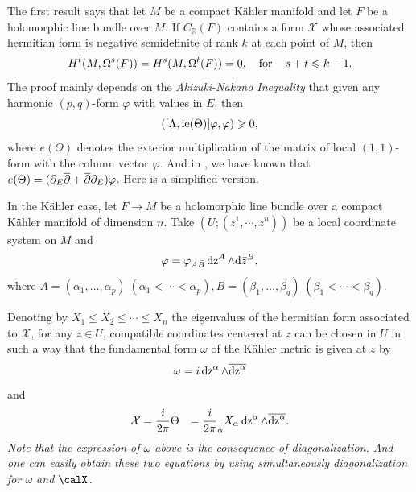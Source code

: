 \documentclass[lang=en,12pt]{beautybook}
\renewcommand{\bd}{\partial}
\begin{document}
The first result says that let $M$ be a
compact K\"ahler manifold and let $F$ be a holomorphic line bundle over $M$. If
$C_{\mathbb{R}} (F)$ contains a form $\mathcal{X}$ whose associated hermitian
form is negative semidefinite of rank $k$ at each point of $M$, then
\[ H^t (M, \Omega^s (F)) = H^s (M, \Omega^t (F)) = 0, \quad \operatorname{for} \quad
  s + t \leqslant k - 1. \]
The proof mainly depends on the \textit{Akizuki-Nakano Inequality} that given any harmonic $(p,
  q)$-form $\varphi$ with values in $E$, then
\begin{equation}
  ([\Lambda, \operatorname{ie} (\Theta)] \varphi, \varphi) \geqslant 0, \label{1}
\end{equation}
where $e(\Theta)$ denotes the exterior multiplication of the matrix of local $(1,1)$-form with the column vector $\varphi$. And in \cite[]{calabi1960compact}, we have known that $e(\Theta)=(\bd_E \bdd+ \bdd\bd_E)\varphi$.
Here is a simplified version.

In the K\"ahler case, let $F \rightarrow M$ be a holomorphic line bundle over a
compact K\"ahler manifold of dimension $n$. Take $(U ; (z^1, \cdots, z^n))$ be a
local coordinate system on $M$ and
\[ \varphi = \relax \varphi_{A \bar{B} } \operatorname{dz}^A \wedge
  \dd \bar z^{B}, \]
where $A=(\alpha_1,\ldots,\alpha_p) \; (\alpha_1<\cdots<\alpha_p), B=(\beta_1,\ldots,\beta_q) \; (\beta_1<\cdots<\beta_q)$.

Denoting by $X_1 \leqslant X_2 \leqslant \cdots \leqslant X_n$ the eigenvalues
of the hermitian form associated to $\mathcal{X}$, for any $z \in U$,
compatible coordinates centered at $z$ can be chosen in $U$ in such a way that
the fundamental form $\omega$ of the K\"ahler metric is given at $z$ by
\[ \omega = i \relax \operatorname{dz}^{\alpha} \wedge \overline{\operatorname{dz}^{\alpha}} \]
and
\begin{eqnarray*}
  \mathcal{X} & = \dfrac{i}{2 \pi} \Theta & = \frac{i}{2 \pi} \relax_{\alpha}
  X_{\alpha} \operatorname{dz}^{\alpha} \wedge \overline{\operatorname{dz}^{\alpha}} .
\end{eqnarray*}
\textit{Note that the expression of $\omega$ above is the consequence of diagonalization. And one can easily obtain these two equations by using simultaneously  diagonalization for $\omega$ and $\calX$.}
\end{document}
